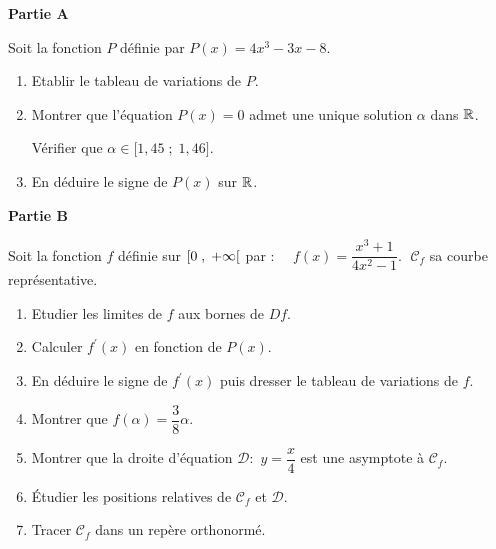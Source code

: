 \begin{exercice}

\textbf{Partie A}

Soit la fonction $ P $ définie par $ P(x)=4x^3-3x-8 $.
\begin{enumerate}
\item Etablir le tableau de variations de $ P $.
\item Montrer que l'équation $ P(x)=0 $  admet une unique  solution $ \alpha $ dans $ \mathbb{R} $.

Vérifier que $ \alpha \in\bigl[1,45\; ;  \; 1,46\bigr]$.
\item En déduire le signe de $ P(x) $ sur $ \mathbb{R} $.
\end{enumerate}

 \textbf{ Partie B}


Soit la fonction $ f $ définie sur $ \left[0 \;,\; +\infty\right[ $ par : $\quad f(x)=\dfrac{x^3+1}{4x^2-1}$.
 $\; \mathcal{C}_f $  sa courbe représentative.

\begin{enumerate}
\item Etudier les limites  de $ f $ aux bornes de $Df $.
\item Calculer  $ f^{\prime}(x) $ en fonction de $ P(x) $.
\item En déduire   le signe de  $ f^{\prime}(x) $ puis  dresser le tableau de variations de $ f $.
\item Montrer que $ f(\alpha)=\dfrac{3}{8}\alpha $.
\item Montrer que la droite  d'équation $ \mathcal{D} :$ $ y=\dfrac{x}{4} $ est une asymptote à $ \mathcal{C}_f $.
\item Étudier les positions relatives de $ \mathcal{C}_f $ et $ \mathcal{D} $.
\item Tracer  $ \mathcal{C}_f $ dans un repère orthonormé.
\end{enumerate}
\end{exercice}

